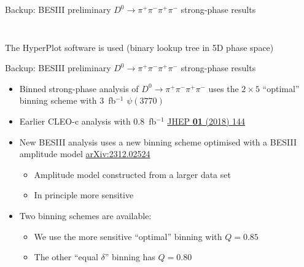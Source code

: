 \documentclass[xcolor={dvipsnames}]{beamer}
\begin{document}
\begin{frame}{Backup: BESIII preliminary $D^0\to\pi^+\pi^-\pi^+\pi^-$ strong-phase results}
\begin{columns}
\begin{column}{0.50\textwidth}
\begin{figure}
      \end{figure}
    \end{column}
  \end{columns}
  \begin{center}
    The HyperPlot software is used (binary lookup tree in 5D phase space)
  \end{center}
\end{frame}

\begin{frame}{Backup: BESIII preliminary $D^0\to\pi^+\pi^-\pi^+\pi^-$ strong-phase results}
  \vspace{0.3cm}
  \begin{itemize}
    \setlength\itemsep{1.0em}
    \item{Binned strong-phase analysis of $D^0\to\pi^+\pi^-\pi^+\pi^-$ uses the $2\times5$ ``optimal'' binning scheme with $3$~fb$^{-1}$ $\psi(3770)$}
    \item{Earlier CLEO-c analysis with $0.8$~fb$^{-1}$ \href{https://link.springer.com/article/10.1007/JHEP01(2018)144}{JHEP \textbf{01} (2018) 144}}
    \item{New BESIII analysis uses a new binning scheme optimised with a BESIII amplitude model \href{https://arxiv.org/abs/2312.02524}{arXiv:2312.02524}}
    \begin{itemize}
      \item{Amplitude model constructed from a larger data set}
      \item{In principle more sensitive}
    \end{itemize}
    \item{Two binning schemes are available:}
    \begin{itemize}
      \item{We use the more sensitive ``optimal'' binning with $Q = 0.85$}
      \item{The other ``equal $\delta$'' binning has $Q = 0.80$}
    \end{itemize}
  \end{itemize}
\end{frame}
\end{document}
